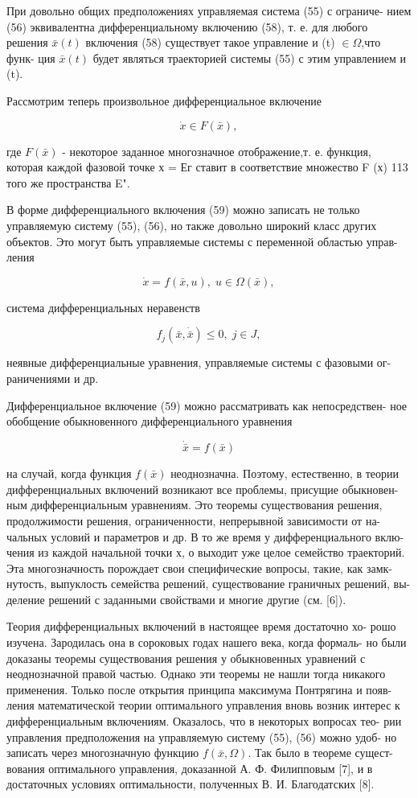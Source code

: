\documentclass[10pt]{article}
\begin{document}
При довольно общих предположениях управляемая система (55) с ограниче- нием (56) эквивалентна дифференциальному включению (58), т. е. для любого решения \(\bar{x}\left( t\right)\) включения (58) существует такое управление и (t) \(\in  \Omega\),что функ- ция \(\bar{x}\left( t\right)\) будет являться траекторией системы (55) с этим управлением и (t).

Рассмотрим теперь произвольное дифференциальное включение

\[
\dot{x} \in  F\left( \bar{x}\right), \tag{59}
\]

где \(F\left( \bar{x}\right)\) - некоторое заданное многозначное отображение,т. е. функция, которая каждой фазовой точке х = Ег ставит в соответствие множество F (х) 113 того же пространства E".

В форме дифференциального включения (59) можно записать не только управляемую систему (55), (56), но также довольно широкий класс других объектов. Это могут быть управляемые системы с переменной областью управ- ления

\[
\dot{x} = f\left( {\bar{x},u}\right),\;u \in  \Omega \left( \bar{x}\right),
\]

система дифференциальных неравенств

\[
{f}_{j}\left( {\bar{x},\dot{\bar{x}}}\right)  \leq  0,\;j \in  J,
\]

неявные дифференциальные уравнения, управляемые системы с фазовыми ог- раничениями и др.

Дифференциальное включение (59) можно рассматривать как непосредствен- ное обобщение обыкновенного дифференциального уравнения

\[
\dot{\bar{x}} = f\left( \bar{x}\right)
\]

на случай, когда функция \(f\left( \bar{x}\right)\) неоднозначна. Поэтому, естественно, в теории дифференциальных включений возникают все проблемы, присущие обыкновен- ным дифференциальным уравнениям. Это теоремы существования решения, продолжимости решения, ограниченности, непрерывной зависимости от на- чальных условий и параметров и др. В то же время у дифференциального вклю- чения из каждой начальной точки х, о выходит уже целое семейство траекторий. Эта многозначность порождает свои специфические вопросы, такие, как замк- нутость, выпуклость семейства решений, существование граничных решений, вы- деление решений с заданными свойствами и многие другие (см. [6]).

Теория дифференциальных включений в настоящее время достаточно хо- рошо изучена. Зародилась она в сороковых годах нашего века, когда формаль- но были доказаны теоремы существования решения у обыкновенных уравнений с неоднозначной правой частью. Однако эти теоремы не нашли тогда никакого применения. Только после открытия принципа максимума Понтрягина и появ- ления математической теории оптимального управления вновь возник интерес к дифференциальным включениям. Оказалось, что в некоторых вопросах тео- рии управления предположения на управляемую систему (55), (56) можно удоб- но записать через многозначную функцию \(f\left( {\bar{x},\Omega }\right)\). Так было в теореме сущест- вования оптимального управления, доказанной А. Ф. Филипповым [7], и в достаточных условиях оптимальности, полученных В. И. Благодатских [8].
\end{document}
